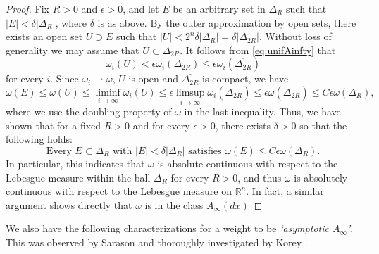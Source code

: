\documentclass[11pt, a4paper,leqno]{amsart}
\theoremstyle{plain}
\theoremstyle{definition}
\theoremstyle{remark}
\numberwithin{equation}{section}
\begin{document}
\begin{proof}
Fix $R > 0$ and $\epsilon > 0$, and let $E$ be an arbitrary set in $\Delta_R$ such that $|E|< \delta|\Delta_R|$, where $\delta$ is as above. By the outer approximation by open sets, there exists an open set $U \supset E$ such that $|U| < 2^n \delta|\Delta_R| = \delta|\Delta_{2R}|$. Without loss of generality we may assume that $U \subset \Delta_{2R}$. It follows from \eqref{eq:unifAinfty} that 
\[ \omega_i(U) < \epsilon \omega_i(\Delta_{2R}) \leq \epsilon \omega_i(\overline{\Delta_{2R}}) \] for every $i$. Since $\omega_i \rightharpoonup \omega$, $U$ is open and $\overline{\Delta_{2R}}$ is compact, we have
\[ \omega(E) \leq \omega(U) \leq \liminf_{i\to \infty} \omega_i(U) \leq \epsilon \limsup_{i\to \infty} \omega_i(\overline{\Delta_{2R}}) \le \epsilon \omega(\overline{\Delta_{2R}}) \leq C\epsilon \omega(\Delta_R), \]
where we use the doubling property of $\omega$ in the last inequality.
Thus, we have shown that for a fixed $R > 0$ and for every $\epsilon > 0$, there exists $\delta >0$ so that the following holds: 
\begin{equation}\label{eq:Ainfty}
	\text{Every } E \subset \Delta_R \text{ with } |E| < \delta|\Delta_R| \text{ satisfies } \omega(E) \leq C \epsilon \omega(\Delta_{R}).
\end{equation} 
In particular, this indicates that $\omega$ is absolute continuous with respect to the Lebesgue measure within the ball $\Delta_R$ for every $R>0$, and thus $\omega$ is absolutely continuous with respect to the Lebesgue measure on $\mathbb{R}^n$. In fact, a similar argument shows directly that $\omega$ is in the class $A_\infty(dx)$
\end{proof}


We also have the following characterizations for a weight to be
\textit{`asymptotic  $A_\infty$'}. This was observed by Sarason \cite{Sarason} and thoroughly investigated by Korey \cite{Kor,Kor2}. 
\end{document}
